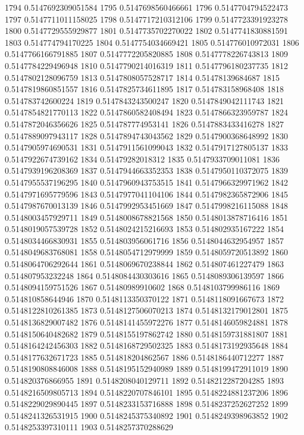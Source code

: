 1794 0.5147692309051584
1795 0.5147698560466661
1796 0.5147704794522473
1797 0.5147711011158025
1798 0.5147717210312106
1799 0.5147723391923278
1800 0.5147729555929877
1801 0.5147735702270022
1802 0.5147741830881591
1803 0.514774794170225
1804 0.5147754034669421
1805 0.514776010972031
1806 0.5147766166791885
1807 0.5147772205820885
1808 0.5147778226743813
1809 0.5147784229496948
1810 0.5147790214016319
1811 0.5147796180237735
1812 0.5147802128096759
1813 0.5147808057528717
1814 0.51478139684687
1815 0.5147819860851557
1816 0.5147825734611895
1817 0.514783158968408
1818 0.514783742600224
1819 0.5147843243500247
1820 0.5147849042111743
1821 0.5147854821770113
1822 0.5147860582408494
1823 0.5147866323959787
1824 0.5147872046356626
1825 0.514787774953141
1826 0.5147883433416278
1827 0.5147889097943117
1828 0.5147894743043562
1829 0.5147900368648992
1830 0.5147905974690531
1831 0.5147911561099043
1832 0.5147917127805137
1833 0.5147922674739162
1834 0.51479282018312
1835 0.5147933709011081
1836 0.5147939196208369
1837 0.5147944663352353
1838 0.5147950110372075
1839 0.5147955537196295
1840 0.5147960943753515
1841 0.5147966329971962
1842 0.5147971695779596
1843 0.5147977041104106
1844 0.5147982365872906
1845 0.5147987670013139
1846 0.5147992953451669
1847 0.5147998216115088
1848 0.5148003457929711
1849 0.5148008678821568
1850 0.5148013878716416
1851 0.5148019057539728
1852 0.5148024215216693
1853 0.514802935167222
1854 0.5148034466830931
1855 0.514803956061716
1856 0.5148044632954957
1857 0.5148049683768081
1858 0.5148054712979999
1859 0.5148059720513892
1860 0.5148064706292644
1861 0.5148069670238844
1862 0.514807461227479
1863 0.514807953232248
1864 0.5148084430303616
1865 0.5148089306139597
1866 0.5148094159751526
1867 0.51480989910602
1868 0.5148103799986116
1869 0.514810858644946
1870 0.5148113350370122
1871 0.5148118091667673
1872 0.5148122810261385
1873 0.5148127506070213
1874 0.5148132179012801
1875 0.5148136829007482
1876 0.5148141455972276
1877 0.5148146059824881
1878 0.5148150640482682
1879 0.5148155197862742
1880 0.5148159731881807
1881 0.5148164242456303
1882 0.5148168729502325
1883 0.5148173192935648
1884 0.5148177632671723
1885 0.514818204862567
1886 0.5148186440712277
1887 0.5148190808846008
1888 0.5148195152940989
1889 0.5148199472911019
1890 0.514820376866955
1891 0.5148208040129711
1892 0.5148212287204285
1893 0.5148216509805713
1894 0.5148220707846101
1895 0.5148224881237206
1896 0.5148229029890445
1897 0.5148233153716888
1898 0.5148237252627252
1899 0.5148241326531915
1900 0.5148245375340892
1901 0.5148249398963852
1902 0.5148253397310111
1903 0.5148257370288629
